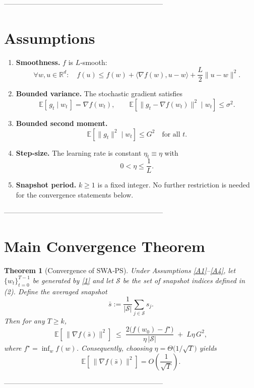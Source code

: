 \documentclass{article}
\newtheorem{theorem}{Theorem}
\newcommand{\E}{\mathbb{E}}
\newcommand{\R}{\mathbb{R}}
\begin{document}
--------------------------------------------------------------------

\section*{Assumptions}
\begin{enumerate}[label=\textbf{A\arabic*.}]
\item \label{A1} \textbf{Smoothness.} $f$ is $L$‑smooth:
\[
\forall w,u\in\R^{d}:\quad f(u)\le f(w)+\langle\nabla f(w),u-w\rangle+\frac{L}{2}\|u-w\|^{2}.
\tag{A1}
\]
\item \label{A2} \textbf{Bounded variance.} The stochastic gradient satisfies
\[
\E\!\left[\,g_t\mid w_t\,\right]=\nabla f(w_t),\qquad 
\E\!\left[\|g_t-\nabla f(w_t)\|^{2}\mid w_t\right]\le\sigma^{2}.
\tag{A2}
\]
\item \label{A3} \textbf{Bounded second moment.}
\[
\E\!\left[\|g_t\|^{2}\mid w_t\right]\le G^{2}\quad\text{for all }t.
\tag{A3}
\]
\item \label{A4} \textbf{Step‑size.} The learning rate is constant $\eta_t\equiv\eta$ with
\[
0<\eta\le\frac{1}{L}.
\tag{A4}
\]
\item \label{A5} \textbf{Snapshot period.} $k\ge 1$ is a fixed integer. No further restriction is needed for the convergence statements below.
\end{enumerate}

--------------------------------------------------------------------

\section*{Main Convergence Theorem}
\begin{theorem}[Convergence of SWA‑PS]\label{thm:main}
Under Assumptions \ref{A1}–\ref{A4}, let $\{w_t\}_{t=0}^{T-1}$ be generated by \eqref{1} and let $\mathcal{S}$ be the set of snapshot indices defined in (2). Define the averaged snapshot
\[
\bar s:=\frac{1}{|\mathcal{S}|}\sum_{j\in\mathcal{S}} s_j .
\]
Then for any $T\ge k$,
\[
\E\!\left[\,\|\nabla f(\bar s)\|^{2}\right]\;\le\;
\frac{2\bigl(f(w_0)-f^{\star}\bigr)}{\eta\,|\mathcal{S}|}
\;+\;L\eta\,G^{2},
\tag{4}
\]
where $f^{\star}=\inf_{w}f(w)$. Consequently, choosing $\eta = \Theta\!\bigl(1/\sqrt{T}\bigr)$ yields
\[
\E\!\left[\,\|\nabla f(\bar s)\|^{2}\right]=O\!\left(\frac{1}{\sqrt{T}}\right).
\]
\end{theorem}

--------------------------------------------------------------------
\end{document}
